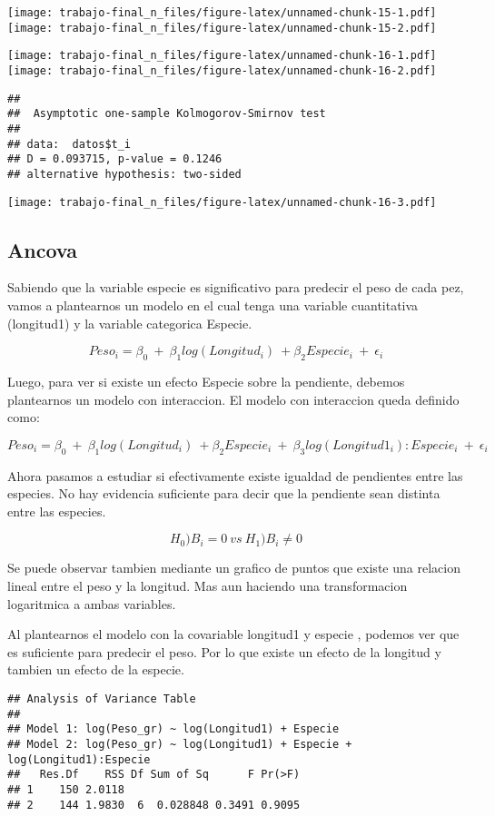 \documentclass[
]{article}
\begin{document}
\texttt{[image: trabajo-final\_n\_files/figure-latex/unnamed-chunk-15-1.pdf]}
\texttt{[image: trabajo-final\_n\_files/figure-latex/unnamed-chunk-15-2.pdf]}

\texttt{[image: trabajo-final\_n\_files/figure-latex/unnamed-chunk-16-1.pdf]}
\texttt{[image: trabajo-final\_n\_files/figure-latex/unnamed-chunk-16-2.pdf]}

\begin{verbatim}
## 
##  Asymptotic one-sample Kolmogorov-Smirnov test
## 
## data:  datos$t_i
## D = 0.093715, p-value = 0.1246
## alternative hypothesis: two-sided
\end{verbatim}

\texttt{[image: trabajo-final\_n\_files/figure-latex/unnamed-chunk-16-3.pdf]}

\subsection{Ancova}\label{ancova}

Sabiendo que la variable especie es significativo para predecir el peso
de cada pez, vamos a plantearnos un modelo en el cual tenga una variable
cuantitativa (longitud1) y la variable categorica Especie.

\[Peso_i = \beta_0\ +\ \beta_1log(Longitud_i)\ +\beta_2Especie_i\  +\ \epsilon_i\]

Luego, para ver si existe un efecto Especie sobre la pendiente, debemos
plantearnos un modelo con interaccion. El modelo con interaccion queda
definido como:

\[Peso_i = \beta_0\ +\ \beta_1log(Longitud_i)\ +\beta_2Especie_i\ +\ \beta_3log(Longitud1_i):Especie_i\ +\ \epsilon_i\]

Ahora pasamos a estudiar si efectivamente existe igualdad de pendientes
entre las especies. No hay evidencia suficiente para decir que la
pendiente sean distinta entre las especies.

\[H_0) B_{i} = 0\ vs\ H_1) B_{i} \neq 0\]

Se puede observar tambien mediante un grafico de puntos que existe una
relacion lineal entre el peso y la longitud. Mas aun haciendo una
transformacion logaritmica a ambas variables.

Al plantearnos el modelo con la covariable longitud1 y especie , podemos
ver que es suficiente para predecir el peso. Por lo que existe un efecto
de la longitud y tambien un efecto de la especie.

\begin{verbatim}
## Analysis of Variance Table
## 
## Model 1: log(Peso_gr) ~ log(Longitud1) + Especie
## Model 2: log(Peso_gr) ~ log(Longitud1) + Especie + log(Longitud1):Especie
##   Res.Df    RSS Df Sum of Sq      F Pr(>F)
## 1    150 2.0118                           
## 2    144 1.9830  6  0.028848 0.3491 0.9095
\end{verbatim}
\end{document}
